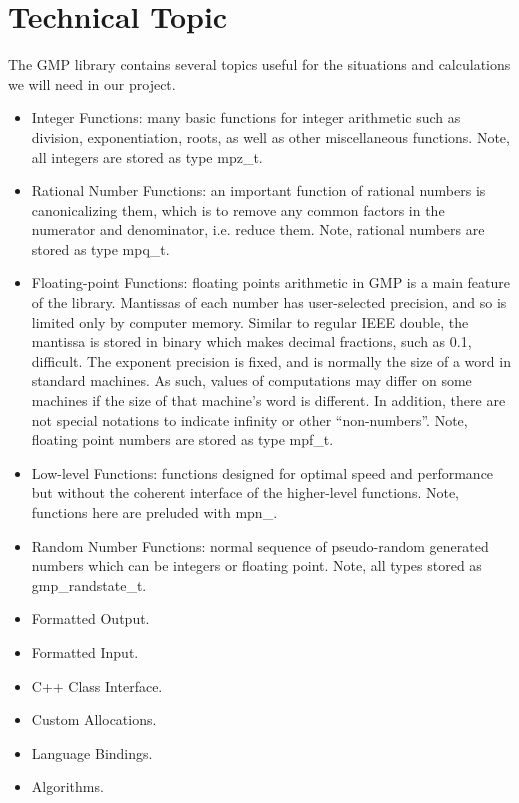 \section{Technical Topic}
\dd \bigskip


The GMP library contains several topics useful for the
situations and calculations we will need in our project.

\begin{itemize}

\item Integer Functions: many basic functions for integer
  arithmetic such as division, exponentiation, roots, as
  well as other miscellaneous functions. Note, all integers
  are stored as type mpz\_t.

\item Rational Number Functions: an important function of
  rational numbers is canonicalizing them, which is to
  remove any common factors in the numerator and
  denominator, i.e. reduce them. Note, rational numbers are
  stored as type mpq\_t.

\item Floating-point Functions: floating points arithmetic
  in GMP is a main feature of the library. Mantissas of each
  number has user-selected precision, and so is limited only
  by computer memory. Similar to regular IEEE double, the
  mantissa is stored in binary   which makes decimal
  fractions, such as 0.1, difficult. The exponent precision
  is fixed, and is normally the size of a word in standard
  machines. As such, values of computations may differ on
  some machines if the size of that machine's word is
  different. In addition, there are not special
  notations to indicate infinity or other ``non-numbers''.
  Note, floating point numbers are stored as type mpf\_t.

\item Low-level Functions: functions designed for optimal
  speed and performance but without the coherent interface
  of the higher-level functions. Note, functions here are
  preluded with mpn\_.

\item Random Number Functions: normal sequence of
  pseudo-random generated numbers which can be integers or
  floating point. Note, all types stored as
  gmp\_randstate\_t.

\item Formatted Output.
\item Formatted Input.
\item C++ Class Interface.
\item Custom Allocations.
\item Language Bindings.
\item Algorithms.

\end{itemize}

